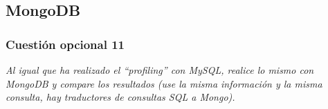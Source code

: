 \subsection{MongoDB}
\subsubsection{Cuestión opcional 11}
\textit{Al igual que ha realizado el “profiling” con MySQL, realice lo mismo con MongoDB y compare los resultados (use la misma información y la misma consulta, hay traductores de consultas SQL a Mongo).}

\newpage




